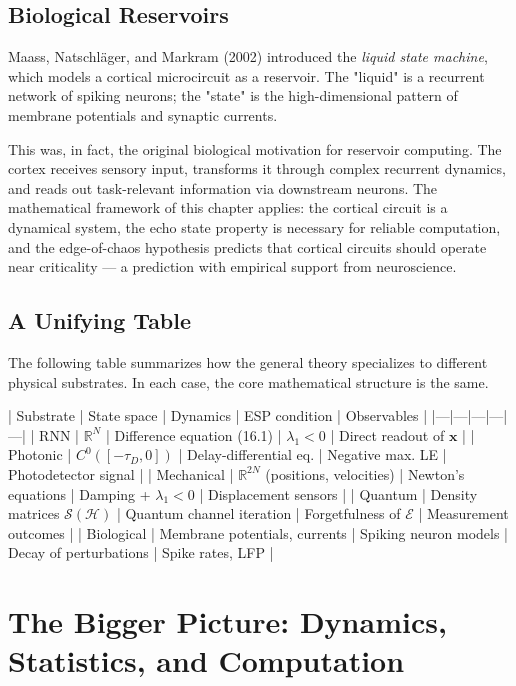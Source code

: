 \subsection{Biological Reservoirs}\label{sec:16.6.5}

Maass, Natschläger, and Markram (2002) introduced the \textit{liquid state machine}, which models a cortical microcircuit as a reservoir. The "liquid" is a recurrent network of spiking neurons; the "state" is the high-dimensional pattern of membrane potentials and synaptic currents.

This was, in fact, the original biological motivation for reservoir computing. The cortex receives sensory input, transforms it through complex recurrent dynamics, and reads out task-relevant information via downstream neurons. The mathematical framework of this chapter applies: the cortical circuit is a dynamical system, the echo state property is necessary for reliable computation, and the edge-of-chaos hypothesis predicts that cortical circuits should operate near criticality --- a prediction with empirical support from neuroscience.

\subsection{A Unifying Table}\label{sec:16.6.6}

The following table summarizes how the general theory specializes to different physical substrates. In each case, the core mathematical structure is the same.

| Substrate | State space | Dynamics | ESP condition | Observables |
|---|---|---|---|---|
| RNN | $\mathbb{R}^N$ | Difference equation (16.1) | $\lambda_1 < 0$ | Direct readout of $\mathbf{x}$ |
| Photonic | $C^0([-\tau_D, 0])$ | Delay-differential eq. | Negative max. LE | Photodetector signal |
| Mechanical | $\mathbb{R}^{2N}$ (positions, velocities) | Newton's equations | Damping + $\lambda_1 < 0$ | Displacement sensors |
| Quantum | Density matrices $\mathcal{S}(\mathcal{H})$ | Quantum channel iteration | Forgetfulness of $\mathcal{E}$ | Measurement outcomes |
| Biological | Membrane potentials, currents | Spiking neuron models | Decay of perturbations | Spike rates, LFP |


\bigskip


\section{The Bigger Picture: Dynamics, Statistics, and Computation}\label{sec:16.7}

